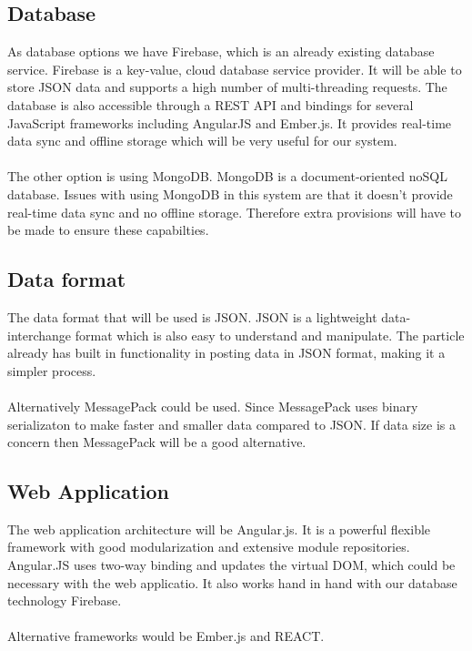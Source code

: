 \documentclass[paper=a4, fontsize=11pt]{scrartcl} %
\begin{document}
	\subsection{Database}
	As database options we have Firebase, which is an already existing database service. Firebase is a key-value, cloud database service provider. It will be
	able to store JSON data and supports a high number of multi-threading requests. The database is also accessible through a REST API and 
	bindings for several JavaScript frameworks including AngularJS and Ember.js. It provides real-time data sync and offline storage which will be
	very useful for our system.\\
	\\The other option is using MongoDB. MongoDB is a document-oriented noSQL database. Issues with using MongoDB in this system are that it
	doesn't provide real-time data sync and no offline storage. Therefore extra provisions will have to be made to ensure these capabilties.
	\subsection{Data format}
	The data format that will be used is JSON. JSON is a lightweight data-interchange format which is also easy to understand and
	manipulate. The particle already has built in functionality in posting data in JSON format, making it a simpler process.\\
	\\Alternatively MessagePack could be used. Since MessagePack uses binary serializaton to make faster and smaller data compared to JSON.
	If data size is a concern then MessagePack will be a good alternative.
	\subsection{Web Application}
	The web application architecture will be Angular.js. It is a powerful flexible framework with good modularization and extensive module
	repositories. Angular.JS uses two-way binding and updates the virtual DOM, which could be necessary with the web applicatio. It also works
	hand in hand with our database technology Firebase.\\
	\\Alternative frameworks would be Ember.js and REACT.
\end{document}
